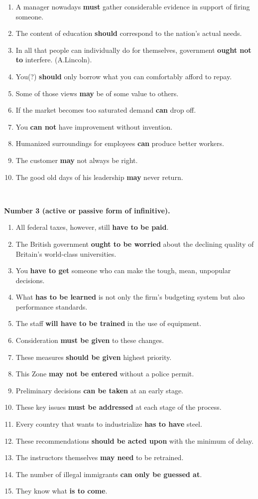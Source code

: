 \documentclass[main.tex]{subfiles}
\begin{document}
\begin{enumerate}[nosep]
	\item A manager nowadays \textbf{must} gather considerable evidence in support of firing someone.
	\item The content of education \textbf{should} correspond to the nation's actual needs.
	\item In all that people can individually do for themselves, government \textbf{ought not to} interfere. (A.Lincoln).
	\item You(?) \textbf{should} only borrow what you can comfortably afford to repay.
	\item Some of those views \textbf{may} be of some value to others.
	\item If the market becomes too saturated demand \textbf{can} drop off.
	\item You \textbf{can not} have improvement without invention.
	\item Humanized surroundings for employees \textbf{can} produce better workers.
	\item The customer \textbf{may} not always be right.
	\item The good old days of his leadership \textbf{may} never return.
\end{enumerate}
\ 

\textbf{Number 3 (active or passive form of infinitive).}

\begin{enumerate}[nosep]
	\item All federal taxes, however, still \textbf{have to be paid}.
	\item The British government \textbf{ought to be worried} about the declining quality of Britain's world-class universities.
	\item You \textbf{have to get} someone who can make the tough, mean, unpopular decisions.
	\item What \textbf{has to be learned} is not only the firm's budgeting system but also performance standards.
	\item The staff \textbf{will have to be trained} in the use of equipment.
	\item Consideration \textbf{must be given} to these changes.
	\item These measures \textbf{should be given} highest priority.
	\item This Zone \textbf{may not be entered} without a police permit.
	\item Preliminary decisions \textbf{can be taken} at an early stage.
	\item These key issues \textbf{must be addressed} at each stage of the process.
	\item Every country that wants to industrialize \textbf{has to have} steel.
	\item These recommendations \textbf{should be acted upon} with the minimum of delay.
	\item The instructors themselves \textbf{may need} to be retrained.
	\item The number of illegal immigrants \textbf{can only be guessed at}.
	\item They know what \textbf{is to come}.
\end{enumerate}
\
\end{document}
